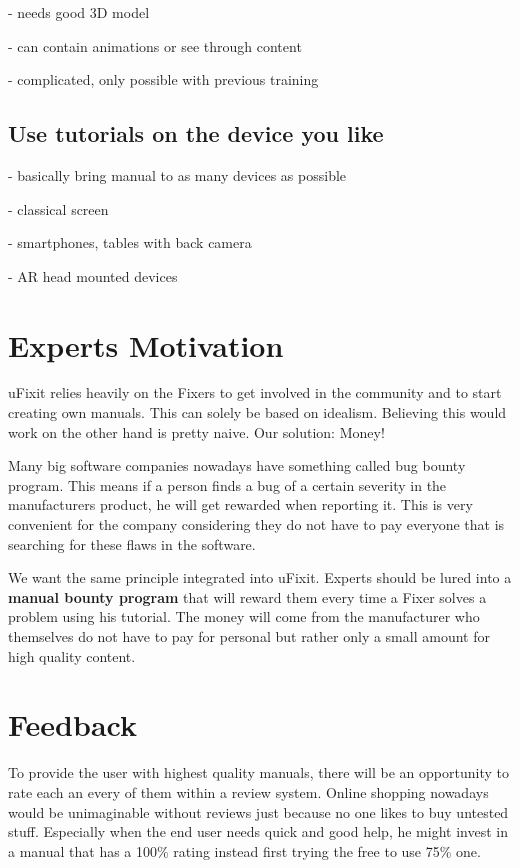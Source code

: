 			- needs good 3D model
			
			- can contain animations or see through content

			- complicated, only possible with previous training

		\subsection{Use tutorials on the device you like}
		
			- basically bring manual to as many devices as possible
			
			- classical screen
			
			- smartphones, tables with back camera
			
			- AR head mounted devices

	\section{Experts Motivation}
	
		uFixit relies heavily on the Fixers to get involved in the community and to start creating own manuals. This can solely be based on idealism. Believing this would work on the other hand is pretty naive. Our solution: Money!
		
		Many big software companies nowadays have something called bug bounty program. This means if a person finds a bug of a certain severity in the manufacturers product, he will get rewarded when reporting it. This is very convenient for the company considering they do not have to pay everyone that is searching for these flaws in the software.
		
		We want the same principle integrated into uFixit. Experts should be lured into a \textbf{manual bounty program} that will reward them every time a Fixer solves a problem using his tutorial. The money will come from the manufacturer who themselves do not have to pay for personal but rather only a small amount for high quality content.
	
	\section{Feedback}
	
		To provide the user with highest quality manuals, there will be an opportunity to rate each an every of them within a review system. Online shopping nowadays would be unimaginable without reviews just because no one likes to buy untested stuff. Especially when the end user needs quick and good help, he might invest in a manual that has a 100\% rating instead first trying the free to use 75\% one.

